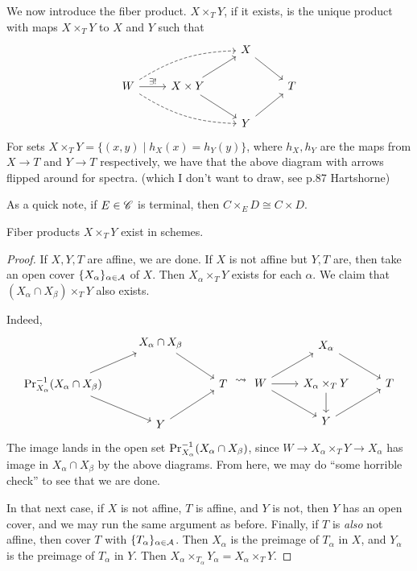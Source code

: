 We now introduce the fiber product. $X \times_T Y$, if it exists, is the unique product with maps $X \times_T Y$ to $X$ and $Y$ such that
\[ \begin{tikzcd}
& & X \arrow[dr] \\
W \arrow[r, "\exists!"] \arrow[rru, dashed, bend left = 15] \arrow[rrd, dashed, bend right = 15] & X \times Y \arrow[ru] \arrow[rd] & & T \\
& & Y \arrow[ur]
\end{tikzcd} \]
For sets $X \times_T Y = \{(x, y) \mid h_X(x) = h_Y(y)\}$, where $h_X, h_Y$ are the maps from $X \to T$ and $Y \to T$ respectively, we have that the above diagram with arrows flipped around for spectra. {\color{crimson}(which I don't want to draw, see p.87 Hartshorne)}

As a quick note, if $E \in \mathscr C$ is terminal, then $C \times_E D \cong C \times D$.

\begin{theorem} \label{thm:fiber_products_exist_in_schemes}
    Fiber products $X \times_T Y$ exist in schemes. 
\end{theorem}
\begin{proof}
    If $X, Y, T$ are affine, we are done. If $X$ is not affine but $Y, T$ are, then take an open cover $\{X_\alpha\}_{\alpha \in \mathcal A}$ of $X$. Then $X_\alpha \times_T Y$ exists for each $\alpha$. We claim that $(X_\alpha \cap X_\beta) \times_T Y$ also exists.
    
    \newpage
    Indeed,
    \[ \begin{tikzcd}
    & X_\alpha \cap X_\beta \arrow[dr] \\
    \opname{Pr}_{X_\alpha}\inv(X_\alpha \cap X_\beta) \arrow[ur] \arrow[dr] & & T \\ & Y \arrow[ur]
    \end{tikzcd} \leadsto \begin{tikzcd}
        & X_\alpha \arrow[dr] \\
        W \arrow[ur] \arrow[dr] \arrow[r] & X_\alpha \times_T Y \arrow[d] & T \\
        & Y \arrow[ur]
    \end{tikzcd} \]
    The image lands in the open set $\operatorname{Pr}_{X_\alpha}^{-1}(X_\alpha \cap X_\beta)$, since $W \to X_\alpha \times_T Y \to X_\alpha$ has image in $X_\alpha \cap X_\beta$ by the above diagrams. From here, we may do ``some horrible check'' to see that we are done.

    In that next case, if $X$ is not affine, $T$ is affine, and $Y$ is not, then $Y$ has an open cover, and we may run the same argument as before. Finally, if $T$ is \textit{also} not affine, then cover $T$ with $\{T_\alpha\}_{\alpha \in \mathcal A}$. Then $X_\alpha$ is the preimage of $T_\alpha$ in $X$, and $Y_\alpha$ is the preimage of $T_\alpha$ in $Y$. Then $X_\alpha \times_{T_\alpha} Y_\alpha = X_\alpha \times_T Y$.
\end{proof}

